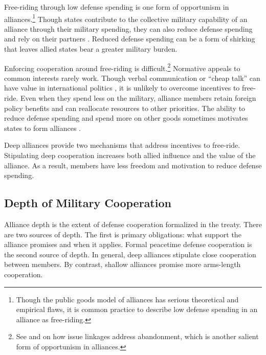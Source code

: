 \documentclass[12pt]{article}
\begin{document}
Free-riding through low defense spending is one form of opportunism in alliances.\footnote{Though the public goods model of alliances has serious theoretical and empirical flaws, it is common practice to describe low defense spending in an alliance as free-riding.}
Though states contribute to the collective military capability of an alliance through their military spending, they can also reduce defense spending and rely on their partners \citep{OlsonZeckhauser1966, Morrow1993, Conybeare1994, SandlerHartley2001}.
Reduced defense spending can be a form of shirking that leaves allied states bear a greater military burden. 


Enforcing cooperation around free-riding is difficult.\footnote{See \citet{Poast2012, Poast2013} and \citet{LongLeeds2006} on how issue linkages address abandonment, which is another salient form of opportunism in alliances.}
Normative appeals to common interests rarely work. 
Though verbal communication or ``cheap talk'' can have value in international politics \citep{Trager2010}, it is unlikely to overcome incentives to free-ride. 
Even when they spend less on the military, alliance members retain foreign policy benefits and can reallocate resources to other priorities. 
The ability to reduce defense spending and spend more on other goods sometimes motivates states to form alliances \citep{Kimball2010, AllenDigiuseppe2013}. 


Deep alliances provide two mechanisms that address incentives to free-ride. 
Stipulating deep cooperation increases both allied influence and the value of the alliance. 
As a result, members have less freedom and motivation to reduce defense spending. 



\subsection{Depth of Military Cooperation} 


Alliance depth is the extent of defense cooperation formalized in the treaty. 
There are two sources of depth. 
The first is primary obligations: what support the alliance promises and when it applies. 
Formal peacetime defense cooperation is the second source of depth. 
In general, deep alliances stipulate close cooperation between members.
By contrast, shallow alliances promise more arms-length cooperation. 
\end{document}
